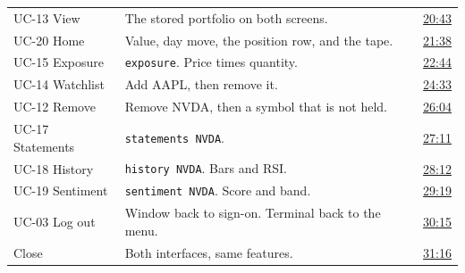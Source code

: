 \documentclass[11pt]{article}
\begin{document}
\begin{center}
\begin{tabularx}{\textwidth}{@{}p{2.2cm}Xp{2.2cm}@{}}
UC-13 View & The stored portfolio on both screens. &
\href{https://youtu.be/J7uWTaclC8k?t=1243}{20:43} \\
UC-20 Home & Value, day move, the position row, and the tape. &
\href{https://youtu.be/J7uWTaclC8k?t=1298}{21:38} \\
UC-15 Exposure & \texttt{exposure}. Price times quantity. &
\href{https://youtu.be/J7uWTaclC8k?t=1364}{22:44} \\
UC-14 Watchlist & Add AAPL, then remove it. &
\href{https://youtu.be/J7uWTaclC8k?t=1473}{24:33} \\
UC-12 Remove & Remove NVDA, then a symbol that is not held. &
\href{https://youtu.be/J7uWTaclC8k?t=1564}{26:04} \\
UC-17 Statements & \texttt{statements NVDA}. &
\href{https://youtu.be/J7uWTaclC8k?t=1631}{27:11} \\
UC-18 History & \texttt{history NVDA}. Bars and RSI. &
\href{https://youtu.be/J7uWTaclC8k?t=1692}{28:12} \\
UC-19 Sentiment & \texttt{sentiment NVDA}. Score and band. &
\href{https://youtu.be/J7uWTaclC8k?t=1759}{29:19} \\
UC-03 Log out & Window back to sign-on. Terminal back to the menu. &
\href{https://youtu.be/J7uWTaclC8k?t=1815}{30:15} \\
Close & Both interfaces, same features. &
\href{https://youtu.be/J7uWTaclC8k?t=1876}{31:16} \\
\bottomrule
\end{tabularx}
\end{center}
\end{document}
